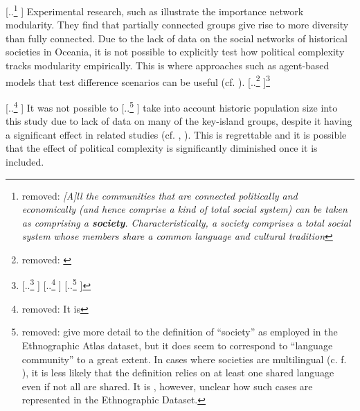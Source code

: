 \documentclass[unnumsec,webpdf,modern,medium]{oup-authoring-template}
\providecommand{\DIFaddtex}[1]{{\protect\color{blue} \sf #1}} %
\providecommand{\DIFdeltex}[1]{{\protect\color{red} [..\footnote{removed: #1} ]}} %
\providecommand{\DIFaddbegin}{} %
\providecommand{\DIFaddend}{} %
\providecommand{\DIFdelbegin}{} %
\providecommand{\DIFdelend}{} %
\providecommand{\DIFadd}[1]{\texorpdfstring{\DIFaddtex{#1}}{#1}} %
\providecommand{\DIFdel}[1]{\texorpdfstring{\DIFdeltex{#1}}{}} %
\newcommand{\DIFscaledelfig}{0.5}
\newlength{\DIFdelgraphicswidth} %
\newlength{\DIFdelgraphicsheight} %
\newcommand{\DIFaddincludegraphics}[2][]{{\color{blue}\fbox{\DIFOincludegraphics[#1]{#2}}}} %
\newcommand{\DIFdelincludegraphics}[2][]{%
\sbox{\DIFdelgraphicsbox}{\DIFOincludegraphics[#1]{#2}}%
\settoboxwidth{\DIFdelgraphicswidth}{\DIFdelgraphicsbox} %
\settoboxtotalheight{\DIFdelgraphicsheight}{\DIFdelgraphicsbox} %
\scalebox{\DIFscaledelfig}{%
\parbox[b]{\DIFdelgraphicswidth}{\usebox{\DIFdelgraphicsbox}\\[-\baselineskip] \rule{\DIFdelgraphicswidth}{0em}}\llap{\resizebox{\DIFdelgraphicswidth}{\DIFdelgraphicsheight}{%
\setlength{\unitlength}{\DIFdelgraphicswidth}%
\begin{picture}(1,1)%
\thicklines\linethickness{2pt} %
{\color[rgb]{1,0,0}\put(0,0){\framebox(1,1){}}}%
{\color[rgb]{1,0,0}\put(0,0){\line( 1,1){1}}}%
{\color[rgb]{1,0,0}\put(0,1){\line(1,-1){1}}}%
\end{picture}%
}\hspace*{3pt}}} %
} %
\DeclareRobustCommand{\DIFaddbegin}{\DIFOaddbegin \let\includegraphics\DIFaddincludegraphics} %
\DeclareRobustCommand{\DIFaddend}{\DIFOaddend \let\includegraphics\DIFOincludegraphics} %
\DeclareRobustCommand{\DIFdelbegin}{\DIFOdelbegin \let\includegraphics\DIFdelincludegraphics} %
\DeclareRobustCommand{\DIFdelend}{\DIFOaddend \let\includegraphics\DIFOincludegraphics} %
\begin{document}
\DIFdel{\emph{[A]ll the communities that are connected politically and economically (and hence comprise a kind of total social system) can be taken as comprising a \textbf{society}. Characteristically, a society comprises a total social system whose members share a common language and cultural tradition}}\DIFdelend \DIFaddbegin \DIFadd{Experimental research, such as \citet{derex2016partial} illustrate the importance network modularity. They find that partially connected groups give rise to more diversity than fully connected. Due to the lack of data on the social networks of historical societies in Oceania, it is not possible to explicitly test how political complexity tracks modularity empirically. This is where approaches such as agent-based models that test difference scenarios can be useful (cf. \citet{reali2014paradox, mann2022cognition})}\DIFaddend .
\DIFdelbegin %
\DIFdel{\citep[22]{roger1981cultural} }\footnote{\DIFdel{Ironically, later in this section \citet[23]{roger1981cultural} quote \citet[422]{schwartz1978culture} in saying that the ``Manus people'' as a society are easily linguistically bounded, when linguists have counted up to 19 languages on the island \citep{glottolog40}. In D-PLACE \citep{d_place_all} the society ``Manus'' in the Ethnographic Atlas is specifically linked to one language out of these 19, Titan }%
\DIFdel{tita1241}%
\DIFdel{.}} 
\addtocounter{footnote}{-1}%
\DIFdelend 

\DIFdelbegin %

\DIFdel{It is }\DIFdelend \DIFaddbegin \DIFadd{It was }\DIFaddend not possible to \DIFdelbegin \DIFdel{give more detail to the definition of ``society'' as employed in the Ethnographic Atlas dataset, but it does seem to correspond to ``language community'' to a great extent. In cases where societies are multilingual (c. f. \citet{evans2017did}), it is less likely that the definition relies on at least one shared language even if not all are shared. It is , however, unclear how such cases are represented in the Ethnographic Dataset.
}\DIFdelend \DIFaddbegin \DIFadd{take into account historic population size into this study due to lack of data on many of the key-island groups, despite it having a significant effect in related studies (cf. \citet{bromham_polynesian_sizes}, \citet{watts_2018}). This is regrettable and it is possible that the effect of political complexity is significantly diminished once it is included. 
}\DIFaddend 
\end{document}
